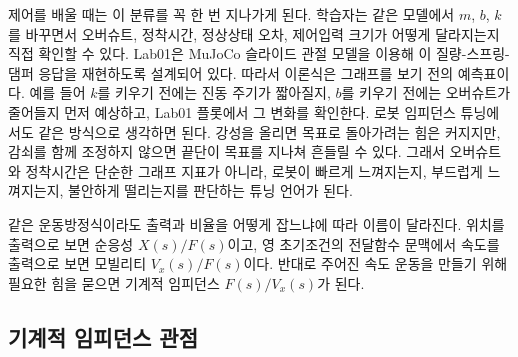 제어를 배울 때는 이 분류를 꼭 한 번 지나가게 된다.
학습자는 같은 모델에서 $m$, $b$, $k$를 바꾸면서 오버슈트, 정착시간, 정상상태 오차, 제어입력 크기가 어떻게 달라지는지 직접 확인할 수 있다.
Lab01은 MuJoCo 슬라이드 관절 모델을 이용해 이 질량-스프링-댐퍼 응답을 재현하도록 설계되어 있다.
따라서 이론식은 그래프를 보기 전의 예측표이다.
예를 들어 $k$를 키우기 전에는 진동 주기가 짧아질지, $b$를 키우기 전에는 오버슈트가 줄어들지 먼저 예상하고, Lab01 플롯에서 그 변화를 확인한다.
로봇 임피던스 튜닝에서도 같은 방식으로 생각하면 된다.
강성을 올리면 목표로 돌아가려는 힘은 커지지만, 감쇠를 함께 조정하지 않으면 끝단이 목표를 지나쳐 흔들릴 수 있다.
그래서 오버슈트와 정착시간은 단순한 그래프 지표가 아니라, 로봇이 빠르게 느껴지는지, 부드럽게 느껴지는지, 불안하게 떨리는지를 판단하는 튜닝 언어가 된다.

같은 운동방정식이라도 출력과 비율을 어떻게 잡느냐에 따라 이름이 달라진다.
위치를 출력으로 보면 순응성 $X(s)/F(s)$이고, 영 초기조건의 전달함수 문맥에서 속도를 출력으로 보면 모빌리티 $V_x(s)/F(s)$이다.
반대로 주어진 속도 운동을 만들기 위해 필요한 힘을 묻으면 기계적 임피던스 $F(s)/V_x(s)$가 된다.

\subsection{기계적 임피던스 관점}

